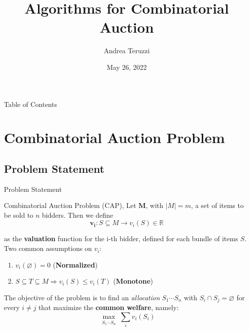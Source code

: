 \documentclass[aspectratio=169,xcolor=dvipsnames]{beamer}
\title[Algorithms for Combinatorial Auction]{Algorithms for Combinatorial Auction} %
\author[Andrea Teruzzi] {Andrea Teruzzi}
\date[20602 - Computer Science (Algorithms)]{May 26, 2022}
\begin{document}
    
    \begin{frame}
        \titlepage
    \end{frame}
     \begin{frame}{Table of Contents}
        \tableofcontents
    \end{frame}
    
    
    
    


    \section{Combinatorial Auction Problem}
    \subsection{Problem Statement }
    \begin{frame}{Problem Statement }
    \begin{block}{Combinatorial Auction Problem (CAP), \cite{algo_gt_nisan_ch11}}
    Let $\boldsymbol{M}$, with $|M| = m $, a set of items to be sold to $n$ bidders. Then we define
    $$
    \boldsymbol{v_i}: S \subseteq M\rightarrow v_i(S) \in \mathbb{R}
    $$
    
    as the \textbf{valuation} function for the i-th bidder, defined for each bundle of items $S$.\\
\pause
    Two common assumptions on $v_i$:
    \begin{enumerate}
        \item $v_i(\varnothing) = 0$ (\textbf{Normalized})
        \item $ S \subseteq T \subseteq M \Rightarrow v_i(S) \leq v_i(T) $
        (\textbf{Monotone})
    \end{enumerate}
\pause
    The objective of the problem is to find an \textit{allocation} $S_1 \cdots S_n$ with $S_i \cap S_j = \varnothing$  for every $ i \neq j$  that maximize the \textbf{common welfare}, namely:
    $$
    \max_{\substack{S_1 \cdots S_n}} \sum_{i} v_i(S_i) 
    $$
    \end{block}
    \end{frame}
\end{document}
